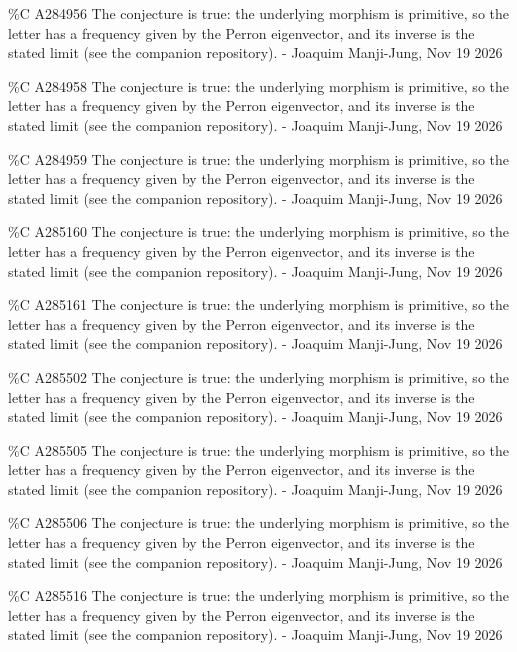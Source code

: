 {\%C A284956 The conjecture is true: the underlying morphism is primitive, so the letter has a frequency given by the Perron eigenvector, and its inverse is the stated limit (see the companion repository). - Joaquim Manji-Jung, Nov 19 2026\par
\%C A284958 The conjecture is true: the underlying morphism is primitive, so the letter has a frequency given by the Perron eigenvector, and its inverse is the stated limit (see the companion repository). - Joaquim Manji-Jung, Nov 19 2026\par
\%C A284959 The conjecture is true: the underlying morphism is primitive, so the letter has a frequency given by the Perron eigenvector, and its inverse is the stated limit (see the companion repository). - Joaquim Manji-Jung, Nov 19 2026\par
\%C A285160 The conjecture is true: the underlying morphism is primitive, so the letter has a frequency given by the Perron eigenvector, and its inverse is the stated limit (see the companion repository). - Joaquim Manji-Jung, Nov 19 2026\par
\%C A285161 The conjecture is true: the underlying morphism is primitive, so the letter has a frequency given by the Perron eigenvector, and its inverse is the stated limit (see the companion repository). - Joaquim Manji-Jung, Nov 19 2026\par
\%C A285502 The conjecture is true: the underlying morphism is primitive, so the letter has a frequency given by the Perron eigenvector, and its inverse is the stated limit (see the companion repository). - Joaquim Manji-Jung, Nov 19 2026\par
\%C A285505 The conjecture is true: the underlying morphism is primitive, so the letter has a frequency given by the Perron eigenvector, and its inverse is the stated limit (see the companion repository). - Joaquim Manji-Jung, Nov 19 2026\par
\%C A285506 The conjecture is true: the underlying morphism is primitive, so the letter has a frequency given by the Perron eigenvector, and its inverse is the stated limit (see the companion repository). - Joaquim Manji-Jung, Nov 19 2026\par
\%C A285516 The conjecture is true: the underlying morphism is primitive, so the letter has a frequency given by the Perron eigenvector, and its inverse is the stated limit (see the companion repository). - Joaquim Manji-Jung, Nov 19 2026\par
}
